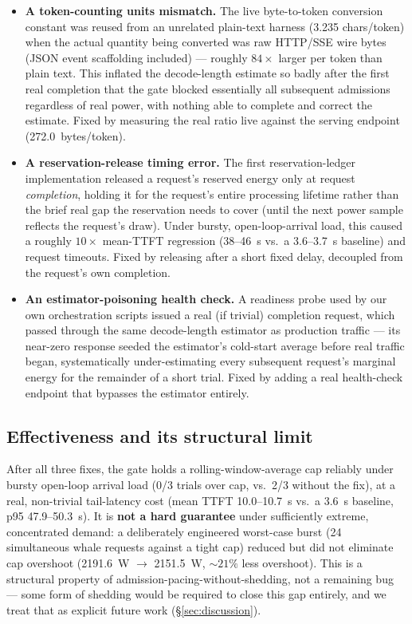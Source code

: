 \documentclass[sigconf,review,anonymous]{acmart}
\begin{document}
\begin{itemize}[leftmargin=*]
  \item \textbf{A token-counting units mismatch.} The live byte-to-token conversion constant
    was reused from an unrelated plain-text harness (3.235 chars/token) when the actual
    quantity being converted was raw HTTP/SSE wire bytes (JSON event scaffolding included) ---
    roughly $84\times$ larger per token than plain text. This inflated the decode-length
    estimate so badly after the first real completion that the gate blocked essentially all
    subsequent admissions regardless of real power, with nothing able to complete and correct
    the estimate. Fixed by measuring the real ratio live against the serving endpoint
    (272.0~bytes/token).
  \item \textbf{A reservation-release timing error.} The first reservation-ledger
    implementation released a request's reserved energy only at request \emph{completion},
    holding it for the request's entire processing lifetime rather than the brief real gap
    the reservation needs to cover (until the next power sample reflects the request's draw).
    Under bursty, open-loop-arrival load, this caused a roughly $10\times$ mean-TTFT
    regression (38--46~s vs.\ a 3.6--3.7~s baseline) and request timeouts. Fixed by releasing
    after a short fixed delay, decoupled from the request's own completion.
  \item \textbf{An estimator-poisoning health check.} A readiness probe used by our own
    orchestration scripts issued a real (if trivial) completion request, which passed through
    the same decode-length estimator as production traffic --- its near-zero response seeded
    the estimator's cold-start average before real traffic began, systematically
    under-estimating every subsequent request's marginal energy for the remainder of a short
    trial. Fixed by adding a real health-check endpoint that bypasses the estimator entirely.
\end{itemize}

\subsection{Effectiveness and its structural limit}
\label{sec:limit}

After all three fixes, the gate holds a rolling-window-average cap reliably under bursty
open-loop arrival load (0/3 trials over cap, vs.\ 2/3 without the fix), at a real,
non-trivial tail-latency cost (mean TTFT 10.0--10.7~s vs.\ a 3.6~s baseline, p95
47.9--50.3~s). It is \textbf{not a hard guarantee} under sufficiently extreme, concentrated
demand: a deliberately engineered worst-case burst (24 simultaneous whale requests against a
tight cap) reduced but did not eliminate cap overshoot (2191.6~W $\rightarrow$ 2151.5~W,
${\sim}21\%$ less overshoot). This is a structural property of admission-pacing-without-shedding,
not a remaining bug --- some form of shedding would be required to close this gap entirely,
and we treat that as explicit future work (\S\ref{sec:discussion}).
\end{document}
